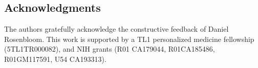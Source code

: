 \documentclass[a4paper,11pt]{article}
\begin{document}

\subsection*{Acknowledgments}

The authors gratefully acknowledge the constructive feedback of Daniel Rosenbloom.
This work is supported by a TL1 personalized medicine fellowship (5TL1TR000082), and NIH grants (R01 CA179044, R01CA185486, R01GM117591, U54 CA193313).



\end{document}
